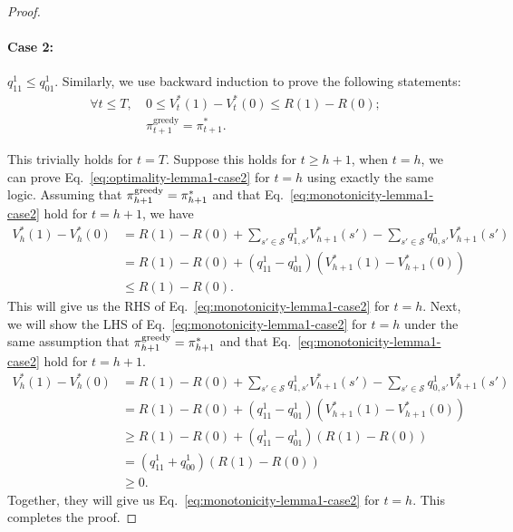 \begin{proof}
\paragraph{Case 2:} $q^1_{11}\leq q^1_{01}$. 
Similarly, we use backward induction to prove the following statements:
\begin{align}
    \forall t\leq T,~&0\leq V^*_t(1)- V_t^*(0)\leq R(1)-R(0)\label{eq:monotonicity-lemma1-case2};\\
    &\pi_{t+1}^{\text{greedy}}=\pi_{t+1}^*\label{eq:optimality-lemma1-case2}.
\end{align}

This trivially holds for $t=T$. Suppose this holds for $t\geq h+1$, when $t=h$, we can prove Eq.~\eqref{eq:optimality-lemma1-case2} for $t=h$ using exactly the same logic. Assuming that $\pi_{h+1}^{\text{greedy}}=\pi_{h+1}^*$ and that Eq.~\eqref{eq:monotonicity-lemma1-case2} hold for $t=h+1$, we have
    \begin{align*}
          V_h^*(1)-V_h^*(0)&=R(1)-R(0)+\sum_{s'\in\mathcal{S}}q^1_{1,s'}V_{h+1}^*(s')-\sum_{s'\in\mathcal{S}}q^1_{0,s'}V_{h+1}^*(s')\\
        &=R(1)-R(0)+ \left(q^1_{11}-q^1_{01}\right)\left(V_{h+1}^*(1)-V_{h+1}^*(0)\right)\\
        &\leq R(1)-R(0).
    \end{align*}
    This will give us the RHS of Eq.~\eqref{eq:monotonicity-lemma1-case2} for $t=h$. Next, we will show the LHS of Eq.~\eqref{eq:monotonicity-lemma1-case2} for $t=h$ under the same assumption that $\pi_{h+1}^{\text{greedy}}=\pi_{h+1}^*$ and that Eq.~\eqref{eq:monotonicity-lemma1-case2} hold for $t=h+1$.
     \begin{align*}
          V_h^*(1)-V_h^*(0)&=R(1)-R(0)+\sum_{s'\in\mathcal{S}}q^1_{1,s'}V_{h+1}^*(s')-\sum_{s'\in\mathcal{S}}q^1_{0,s'}V_{h+1}^*(s')\\
        &=R(1)-R(0)+ \left(q^1_{11}-q^1_{01}\right)\left(V_{h+1}^*(1)-V_{h+1}^*(0)\right)\\
        &\geq R(1)-R(0)+\left(q^1_{11}-q^1_{01}\right)\left(R(1)-R(0)\right)\\
        &=\left(q^1_{11}+q_{00}^1\right)\left(R(1)-R(0)\right)\\
        &\geq 0.
    \end{align*}
    Together, they will give us Eq.~\eqref{eq:monotonicity-lemma1-case2} for $t=h$. This completes the proof.
\end{proof}
